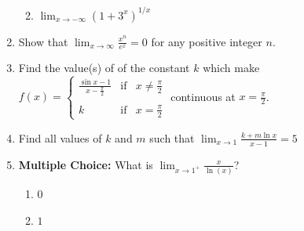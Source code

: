 \documentclass[12pt]{article}
\newif\ifans
\begin{document}
\begin{enumerate}
\begin{enumerate}
\ifans{\fbox{$3$}} \fi

\item $\lim_{x \rightarrow -\infty}{(1+3^x)^{1/x}}$

\ifans{\fbox{$1$}} \fi

\end{enumerate}

\item Show that $\lim_{x \rightarrow \infty}{\frac{x^n}{e^x}}=0$ for any positive integer $n$.

\ifans{\fbox{\parbox{1\linewidth}{$\lim_{x \rightarrow \infty}{\frac{x^n}{e^x}}$ is of the indeterminate form $\frac{\infty}{\infty}$, so, we may apply L'Hopital's Rule:
$$\lim_{x \rightarrow \infty}{\frac{x^n}{e^x}}=\lim_{x \rightarrow \infty}{\frac{nx^{n-1}}{e^x}}$$
This new limit is also of the indeterminate form $\frac{\infty}{\infty}$, so, we may again apply L'Hopital's Rule:
$$\lim_{x \rightarrow \infty}{\frac{nx^{n-1}}{e^x}}=\lim_{x \rightarrow \infty}{\frac{n(n-1)x^{n-2}}{e^x}}$$
In fact, we repeat the process until we end up with the following limit:
$$\lim_{x \rightarrow \infty}{\frac{n(n-1)(n-2)\dots(2)(1)}{e^x}}$$
which equals 0.  Thus, $\lim_{x \rightarrow \infty}{\frac{x^n}{e^x}}=0$}}} \fi

\item Find the value(s) of of the constant $k$ which make $f(x)=\left\{\begin{array}{lll}
\frac{\sin{x}-1}{x-\frac{\pi}{2}} & \text{if} & x \neq \frac{\pi}{2}\\
&&\\
k & \text{if} & x=\frac{\pi}{2}
\end{array}\right.$ continuous at $x=\frac{\pi}{2}$.

\ifans{\fbox{$k=0$}} \fi

\item Find all values of $k$ and $m$ such that $\lim_{x \rightarrow 1}{\frac{k+m\ln{x}}{x-1}}=5$

\ifans{\fbox{$k=0$ and $m=5$}} \fi

\item {\bf Multiple Choice:} What is $\displaystyle \lim_{x\rightarrow 1^+} \frac{x}{\ln(x)}$?

\begin{enumerate}

\item $0$\\

\item $1$\\


\end{enumerate}
\end{enumerate}
\end{document}
